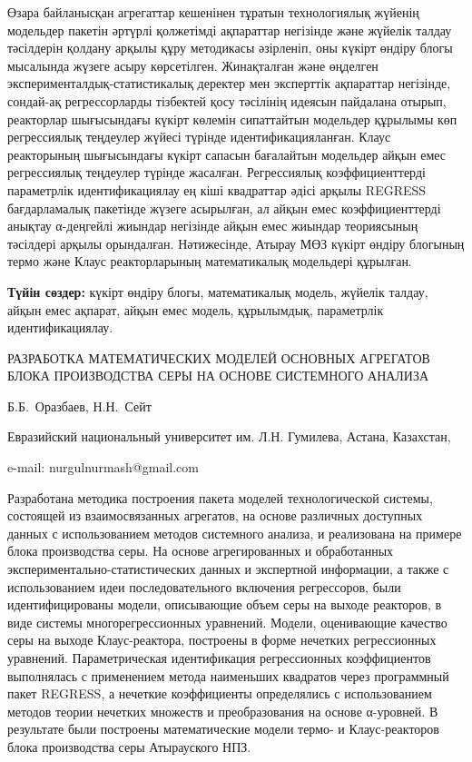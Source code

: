 Өзара байланысқан агрегаттар кешенінен тұратын технологиялық жүйенің
модельдер пакетін әртүрлі қолжетімді ақпараттар негізінде және жүйелік
талдау тәсілдерін қолдану арқылы құру методикасы әзірленіп, оны күкірт
өндіру блогы мысалында жүзеге асыру көрсетілген. Жинақталған және
өңделген эксперименталдық-статистикалық деректер мен эксперттік
ақпараттар негізінде, сондай-ақ регрессорларды тізбектей қосу тәсілінің
идеясын пайдалана отырып, реакторлар шығысындағы күкірт көлемін
сипаттайтын модельдер құрылымы көп регрессиялық теңдеулер жүйесі түрінде
идентификацияланған. Клаус реакторының шығысындағы күкірт сапасын
бағалайтын модельдер айқын емес регрессиялық теңдеулер түрінде жасалған.
Регрессиялық коэффициенттерді параметрлік идентификациялау ең кіші
квадраттар әдісі арқылы REGRESS бағдарламалық пакетінде жүзеге
асырылған, ал айқын емес коэффициенттерді анықтау α-деңгейлі жиындар
негізінде айқын емес жиындар теориясының тәсілдері арқылы орындалған.
Нәтижесінде, Атырау МӨЗ күкірт өндіру блогының термо және Клаус
реакторларының математикалық модельдері құрылған.

{\bfseries Түйін сөздер:} күкірт өндіру блогы, математикалық модель,
жүйелік талдау, айқын емес ақпарат, айқын емес модель, құрылымдық,
параметрлік идентификациялау.

\begin{header}
РАЗРАБОТКА МАТЕМАТИЧЕСКИХ МОДЕЛЕЙ ОСНОВНЫХ АГРЕГАТОВ БЛОКА ПРОИЗВОДСТВА СЕРЫ НА ОСНОВЕ СИСТЕМНОГО АНАЛИЗА

Б.Б.~Оразбаев,
Н.Н.~Сейт\envelope
\end{header}

\begin{affil}
Евразийский национальный университет им. Л.Н. Гумилева, Астана, Казахстан,

e-mail: nurgulnurmash@gmail.com
\end{affil}

Разработана методика построения пакета моделей технологической системы,
состоящей из взаимосвязанных агрегатов, на основе различных доступных
данных с использованием методов системного анализа, и реализована на
примере блока производства серы. На основе агрегированных и обработанных
экспериментально-статистических данных и экспертной информации, а также
с использованием идеи последовательного включения регрессоров, были
идентифицированы модели, описывающие объем серы на выходе реакторов, в
виде системы многорегрессионных уравнений. Модели, оценивающие качество
серы на выходе Клаус-реактора, построены в форме нечетких регрессионных
уравнений. Параметрическая идентификация регрессионных коэффициентов
выполнялась с применением метода наименьших квадратов через программный
пакет REGRESS, а нечеткие коэффициенты определялись с использованием
методов теории нечетких множеств и преобразования на основе α-уровней. В
результате были построены математические модели термо- и Клаус-реакторов
блока производства серы Атырауского НПЗ.

